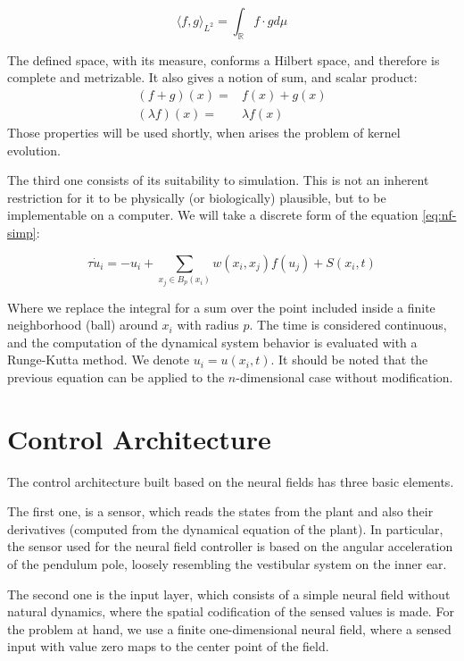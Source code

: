 \begin{equation}
  \label{eq:eq-l2}
  \langle f,g \rangle_{L^2} = \int_{\mathbb{R}}{f\cdot g d\mu}
\end{equation}

The defined space, with its measure, conforms a Hilbert space, and
therefore is complete and metrizable. It also gives a notion of sum,
and scalar product:
\begin{eqnarray}
  \label{eq:eq-leb-opers}
  (f+g)(x)=&f(x)+g(x) \\
  (\lambda f)(x)=&\lambda f(x)
\end{eqnarray}
Those properties will be used shortly, when arises the problem of
kernel evolution.

The third one consists of its suitability to simulation. This is not an
inherent restriction for it to be physically (or biologically)
plausible, but to be implementable on a computer. We will take a
discrete form of the equation \ref{eq:nf-simp}:

\begin{equation}
  \label{eq:nf-disc}
  \tau \dot{u}_i=-u_i+\sum_{x_j \in B_p(x_i)} {w\left(x_i,x_j\right)
    f\left( u_j \right)}+S(x_i,t)
\end{equation}

Where we replace the integral for a sum over the point included inside
a finite neighborhood (ball) around $x_i$ with radius $p$. The time is considered
continuous, and the computation of the dynamical system behavior is
evaluated with a Runge-Kutta method. We denote $u_i=u(x_i,t)$. It
should be noted that the previous equation can be applied to the
$n$-dimensional case without modification.

\section{Control Architecture}
The control architecture built based on the neural fields has three
basic elements. 

The first one, is a sensor, which reads the states
from the plant and also their derivatives (computed from the dynamical
equation of the plant). In particular, the sensor used for the neural
field controller is based on the angular acceleration of the pendulum
pole, loosely resembling the vestibular system on the inner ear.

The second one is the input layer, which consists of a simple neural
field without natural dynamics, where the spatial codification of the
sensed values is made. For the problem at hand, we use a
finite one-dimensional neural field, where a sensed input with value
zero maps to the center point of the field.


